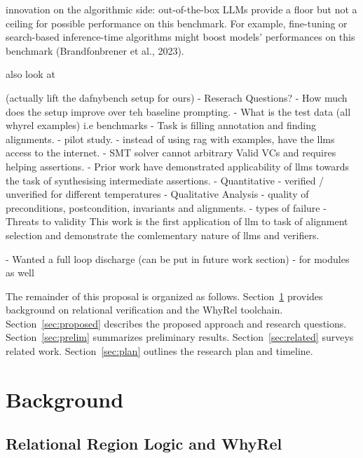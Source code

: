 \documentclass[12pt,letterpaper]{article}
\begin{document}
innovation on the algorithmic side: out-of-the-box LLMs
provide a floor but not a ceiling for possible performance on this benchmark. For example, fine-tuning
or search-based inference-time algorithms might boost models' performances on this benchmark
(Brandfonbrener et al., 2023).

also look at \cite{mugnier_2025_oopsla}

(actually lift the dafnybench setup for ours)
- Reserach Questions?
- How much does the setup improve over teh baseline prompting.
- What is the test data (all whyrel examples) i.e benchmarks
- Task is filling annotation and finding alignments.
- pilot study.
- instead of using rag with examples, have the llms access to the internet.
- SMT solver cannot arbitrary Valid VCs and requires helping assertions.
- Prior work have demonstrated applicability of llms towards the task of synthesising intermediate assertions.
- Quantitative 
  - verified / unverified for different temperatures
- Qualitative Analysis
  - quality of preconditions, postcondition, invariants and alignments.
- types of failure
- Threats to validity
This work is the first application of llm to task of alignment selection and demonstrate the comlementary nature of llms and verifiers.

- Wanted a full loop discharge (can be put in future work section)
- for modules as well \cite{zhong_2025_LMPL}


The remainder of this proposal is organized as follows.
Section~\ref{sec:background} provides background on relational verification
and the WhyRel toolchain.
Section~\ref{sec:proposed} describes the proposed approach and research
questions.
Section~\ref{sec:prelim} summarizes preliminary results.
Section~\ref{sec:related} surveys related work.
Section~\ref{sec:plan} outlines the research plan and timeline.

\section{Background}
\label{sec:background}

\subsection{Relational Region Logic and WhyRel}

\end{document}
